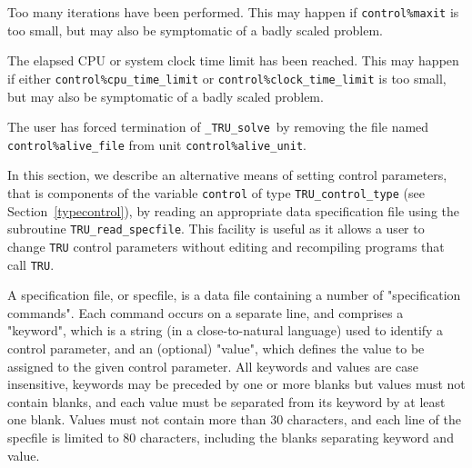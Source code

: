 \documentclass{galahad}
\newcommand{\packagename}{TRU}
\newcommand{\fullpackagename}{\libraryname\_\packagename}
\newcommand{\solver}{{\tt \fullpackagename\_solve}}
\begin{document}
\begin{description}
 Too many iterations have been performed.
  This may happen if
    {\tt control\%maxit} is too small, but may also be symptomatic of
    a badly scaled problem.

 The elapsed CPU or system clock time limit has been
    reached. This may happen if either {\tt control\%cpu\_time\_limit} or
    {\tt control\%clock\_time\_limit} is too small, but may also be symptomatic
    of a badly scaled problem.

 The user has forced termination of \solver\
     by removing the file named {\tt control\%a\-live\_file} from
     unit {\tt control\%alive\_unit}.

\end{description}


\galfeatures
\noindent In this section, we describe an alternative means of setting
control parameters, that is components of the variable {\tt control} of type
{\tt \packagename\_control\_type}
(see Section~\ref{typecontrol}),
by reading an appropriate data specification file using the
subroutine {\tt \packagename\_read\_specfile}. This facility
is useful as it allows a user to change  {\tt \packagename} control parameters
without editing and recompiling programs that call {\tt \packagename}.

A specification file, or specfile, is a data file containing a number of
"specification commands". Each command occurs on a separate line,
and comprises a "keyword",
which is a string (in a close-to-natural language) used to identify a
control parameter, and
an (optional) "value", which defines the value to be assigned to the given
control parameter. All keywords and values are case insensitive,
keywords may be preceded by one or more blanks but
values must not contain blanks, and
each value must be separated from its keyword by at least one blank.
Values must not contain more than 30 characters, and
each line of the specfile is limited to 80 characters,
including the blanks separating keyword and value.
\end{document}
